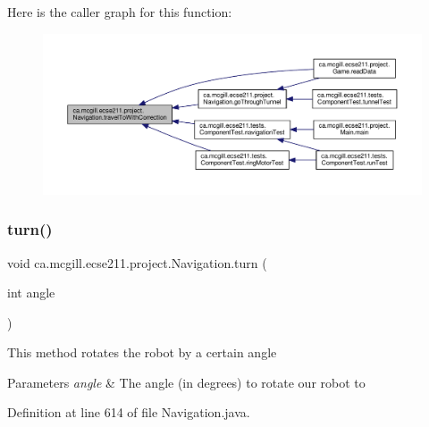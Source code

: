 Here is the caller graph for this function\+:\nopagebreak
\begin{figure}[H]
\begin{center}
\leavevmode
\includegraphics[width=350pt]{classca_1_1mcgill_1_1ecse211_1_1project_1_1_navigation_ae7230e905494002087416294f12cae6a_icgraph}
\end{center}
\end{figure}
\mbox{\label{classca_1_1mcgill_1_1ecse211_1_1project_1_1_navigation_ad74286ad36d333bfaf57661837457b76}} 
\subsubsection{\texorpdfstring{turn()}{turn()}}
{\footnotesize\ttfamily void ca.\+mcgill.\+ecse211.\+project.\+Navigation.\+turn (\begin{DoxyParamCaption}\item[{int}]{angle }\end{DoxyParamCaption})}

This method rotates the robot by a certain angle


\begin{DoxyParams}{Parameters}
{\em angle} & The angle (in degrees) to rotate our robot to \\
\hline
\end{DoxyParams}


Definition at line 614 of file Navigation.\+java.


